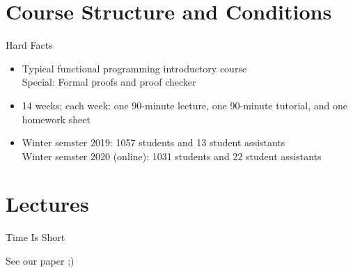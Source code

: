 \documentclass{beamer}
\begin{document}
\section{Course Structure and Conditions}
\begin{frame}{Hard Facts}
\begin{itemize}[<+->]
  \item Typical functional programming introductory course\\
    Special: Formal proofs and proof checker
  \item 14 weeks; each week: one 90-minute lecture, one 90-minute tutorial, and one homework sheet
   \item Winter semster 2019: 1057 students and 13 student assistants\\
     Winter semster 2020 (online): 1031 students and 22 student assistants
\end{itemize}
\end{frame}


\section{Lectures}
\begin{frame}{Time Is Short}
  \centerline{\alert{\Large{See our paper ;)}}}
\end{frame}


\end{document}
